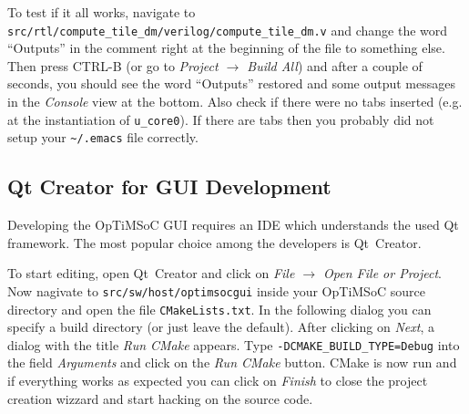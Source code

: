 To test if it all works, navigate to
\verb|src/rtl/compute_tile_dm/verilog/compute_tile_dm.v| and change the word
``Outputs'' in the comment right at the beginning of the file to something
else. Then press CTRL-B (or go to \emph{Project $\rightarrow$ Build All}) and
after a couple of seconds, you should see the word ``Outputs'' restored and
some output messages in the \emph{Console} view at the bottom. Also check if
there were no tabs inserted (e.g. at the instantiation of \verb|u_core0|). If
there are tabs then you probably did not setup your \verb|~/.emacs| file
correctly.

\subsection{Qt Creator for GUI Development}

Developing the OpTiMSoC GUI requires an IDE which understands the used Qt
framework. The most popular choice among the developers is Qt~Creator.

To start editing, open Qt~Creator and click on \emph{File $\rightarrow$ Open
File or Project}. Now nagivate to \verb|src/sw/host/optimsocgui| inside your
OpTiMSoC source directory and open the file \verb|CMakeLists.txt|. In the
following dialog you can specify a build directory (or just leave the default).
After clicking on \emph{Next}, a dialog with the title \emph{Run CMake}
appears. Type \verb|-DCMAKE_BUILD_TYPE=Debug| into the field
\emph{Arguments} and click on the \emph{Run CMake} button. CMake is now run and
if everything works as expected you can click on \emph{Finish} to close the
project creation wizzard and start hacking on the source code.
